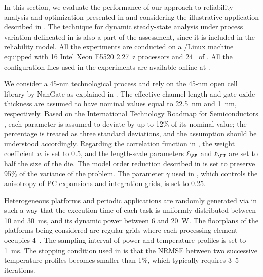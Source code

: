 In this section, we evaluate the performance of our approach to reliability
analysis and optimization presented in  and
 considering the illustrative application described in
. The technique for dynamic steady-state
analysis under process variation delineated in
 is also a part of the assessment, since it
is included in the reliability model. All the experiments are conducted on a
/Linux machine equipped with 16 Intel Xeon E5520 2.27~z
processors and 24~ of . All the configuration files used in the
experiments are available online at \cite{eslab2015}.

We consider a 45-nm technological process and rely on the 45-nm open cell
library by NanGate \cite{nangate} as explained in
. The effective channel length and gate
oxide thickness are assumed to have nominal values equal to 22.5~nm and 1~nm,
respectively. Based on the International Technology Roadmap for Semiconductors
\cite{itrs}, each parameter is assumed to deviate by up to 12\% of its nominal
value; the percentage is treated as three standard deviations, and the
assumption should be understood accordingly. Regarding the correlation function
in , the weight coefficient $w$ is set to 0.5, and the
length-scale parameters $\ell_\SE$ and $\ell_\OU$ are set to half the size of
the die. The model order reduction described in
 is set to preserve 95\% of the variance of the
problem. The parameter $\gamma$ used in , which
controls the anisotropy of \ac{PC} expansions and integration grids, is set to
0.25.

Heterogeneous platforms and periodic applications are randomly generated via
 \cite{dick1998} in such a way that the execution time of each task is
uniformly distributed between 10 and 30~ms, and its dynamic power between 6 and
20~W. The floorplans of the platforms being considered are regular grids where
each processing element occupies 4~. The sampling interval \dt of
power and temperature profiles is set to 1~ms. The stopping condition used in
 is that the \ac{NRMSE} between
two successive temperature profiles becomes smaller than 1\%, which typically
requires 3--5 iterations.



